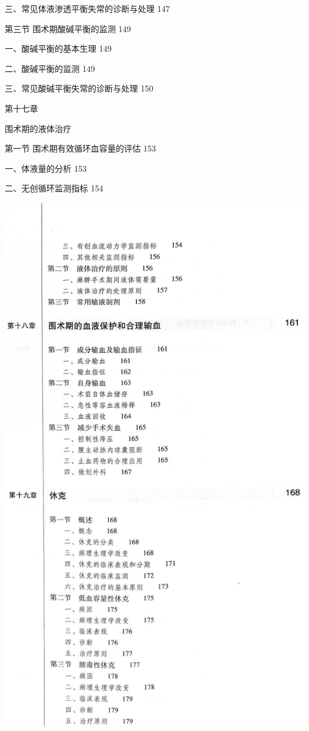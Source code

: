 \documentclass[10pt]{article}
\begin{document}
三、常见体液渗透平衡失常的诊断与处理 147

第三节 围术期酸碱平衡的监测 149

一、酸碱平衡的基本生理 149

二、酸碱平衡的监测 149

三、常见酸碱平衡失常的诊断与处理 150

第十七章

围术期的液体治疗

第一节 围术期有效循环血容量的评估 153

一、体液量的分析 153

二、无创循环监测指标 154

\begin{center}
\includegraphics[max width=\textwidth]{2024_07_09_002a177993bd97d1d6d7g-023}
\end{center}
\end{document}
